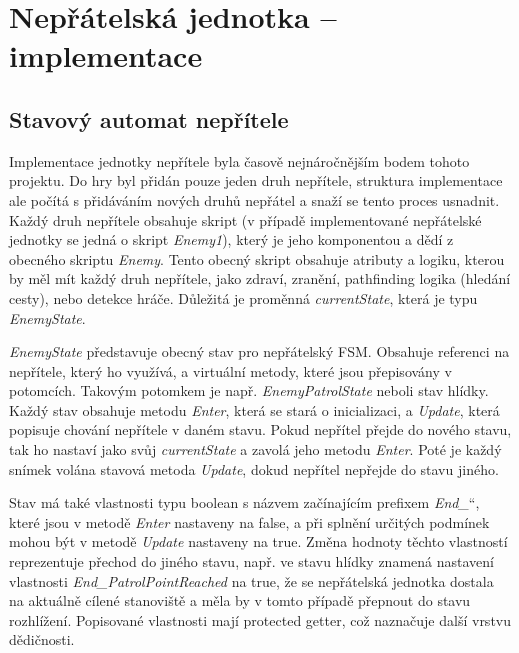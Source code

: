 \documentclass[FM,Proj,bw]{tulthesis}
\begin{document}
	
	
	\section{Nepřátelská jednotka – implementace} %
	\label{chpFSM}
	
	\subsection{Stavový automat nepřítele}
	
	Implementace jednotky nepřítele byla časově nejnáročnějším bodem tohoto projektu. Do hry byl přidán pouze jeden druh nepřítele, struktura implementace ale počítá s přidáváním nových druhů nepřátel a snaží se tento proces usnadnit. Každý druh nepřítele obsahuje skript (v případě implementované nepřátelské jednotky se jedná o skript \textit{Enemy1}), který je jeho komponentou a dědí z obecného skriptu \textit{Enemy}. Tento obecný skript obsahuje atributy a logiku, kterou by měl mít každý druh nepřítele, jako zdraví, zranění, pathfinding logika (hledání cesty), nebo detekce hráče. Důležitá je proměnná \textit{currentState}, která je typu \textit{EnemyState}.
	
	\textit{EnemyState} představuje obecný stav pro nepřátelský FSM. Obsahuje referenci na nepřítele, který ho využívá, a virtuální metody, které jsou přepisovány v potomcích. Takovým potomkem je např. \textit{EnemyPatrolState} neboli stav hlídky. Každý stav obsahuje metodu \textit{Enter}, která se stará o inicializaci, a \textit{Update}, která popisuje chování nepřítele v daném stavu.  Pokud nepřítel přejde do nového stavu, tak ho nastaví jako svůj \textit{currentState} a zavolá jeho metodu \textit{Enter}. Poté je každý snímek volána stavová metoda \textit{Update}, dokud nepřítel nepřejde do stavu jiného.
	
	Stav má také vlastnosti typu boolean s názvem začínajícím prefixem \quotedblbase \textit{End\_}\textquotedblleft , které jsou v metodě \textit{Enter} nastaveny na false, a při splnění určitých podmínek mohou být v metodě \textit{Update} nastaveny na true. Změna hodnoty těchto vlastností reprezentuje přechod do jiného stavu, např. ve stavu hlídky znamená nastavení vlastnosti \textit{End\_PatrolPointReached} na true, že se nepřátelská jednotka dostala na aktuálně cílené stanoviště a měla by v tomto případě přepnout do stavu rozhlížení. Popisované vlastnosti mají protected getter, což naznačuje další vrstvu dědičnosti.
	
\end{document}
